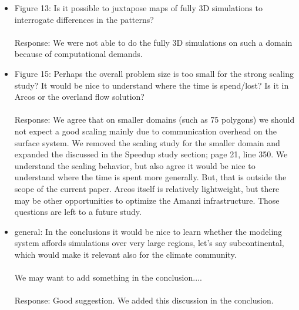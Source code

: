 \documentclass[12pt]{article}\usepackage{amsmath, amssymb, graphicx, array}
\begin{document}
\begin{itemize}
\item Figure 13: Is it possible to juxtapose maps of fully 3D simulations to interrogate differences in the patterns? \\ \\
Response: We were not able to do the fully 3D simulations on such a domain because of computational demands. 

\item Figure 15: Perhaps the overall problem size is too small for the strong scaling study? It would be nice to understand where the time is spend/lost? Is it in Arcos or the overland flow solution? \\ \\ 
Response: We agree that on smaller domains (such as 75 polygons) we should not expect a good scaling mainly due to communication overhead on the surface system. We removed the scaling study for the smaller domain and expanded the discussed in the Speedup study section; page 21, line 350. We understand the scaling behavior, but also agree it would be nice to understand where the time is spent more generally.  But, that is outside the scope of the current paper. Arcos itself is relatively lightweight, but there may be other opportunities to optimize the Amanzi infrastructure. Those questions are left to a future study. 

\item general:  In the conclusions it would be nice to learn whether the modeling system affords simulations over very large regions, let's say subcontinental, which would make it relevant also for the climate community. \\ \\
We may want to add something in the conclusion....\\ \\
Response: Good suggestion. We added this discussion in the conclusion. 
\end{itemize}
\end{document}
